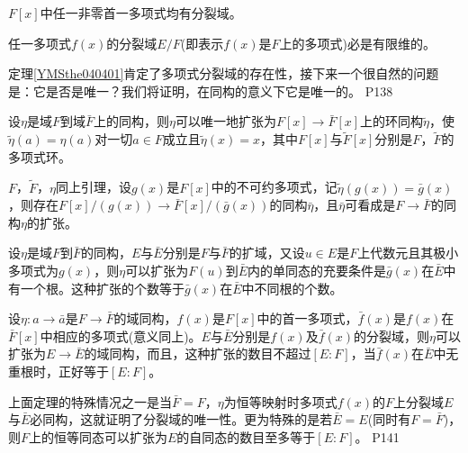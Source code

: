 \begin{theorem}\label{YMSthe040401}
	$F[x]$中任一非零首一多项式均有分裂域。
\end{theorem}

\begin{proposition}
	任一多项式$f(x)$的分裂域$E/F$(即表示$f(x)$是$F$上的多项式)必是有限维的。
\end{proposition}

\original
{
	定理\ref{YMSthe040401}肯定了多项式分裂域的存在性，接下来一个很自然的问题是：它是否是唯一？我们将证明，在同构的意义下它是唯一的。
}
{P138}

\begin{lemma}
	设$\eta$是域$F$到域$\bar{F}$上的同构，则$\eta$可以唯一地扩张为$F[x]\rightarrow \bar{F}[x]$上的环同构$\tilde{\eta}$，使$\tilde{\eta}(a)=\eta(a)$对一切$a\in F$成立且$\tilde{\eta}(x)=x$，其中$F[x]$与$\tilde{F}[x]$分别是$F$，$\tilde{F}$的多项式环。
\end{lemma}

\begin{lemma}
	$F$，$\tilde{F}$，$\eta$同上引理，设$g(x)$是$F[x]$中的不可约多项式，记$\tilde{\eta}(g(x))=\bar{g}(x)$，则存在$F[x]/(g(x))\rightarrow \bar{F}[x]/(\bar{g}(x))$的同构$\bar{\eta}$，且$\bar{\eta}$可看成是$F\rightarrow \bar{F}$的同构$\eta$的扩张。
\end{lemma}


\begin{lemma}
	设$\eta$是域$F$到$\bar{F}$的同构，$E$与$\bar{E}$分别是$F$与$\bar{F}$的扩域，又设$u\in E$是$F$上代数元且其极小多项式为$g(x)$，则$\eta$可以扩张为$F(u)$到$\bar{E}$内的单同态的充要条件是$\bar{g}(x)$在$\bar{E}$中有一个根。这种扩张的个数等于$\bar{g}(x)$在$\bar{E}$中不同根的个数。
\end{lemma}


\begin{theorem}\label{YMSthe040402}
	设$\eta :a\rightarrow \bar{a}$是$F\rightarrow\bar{F}$的域同构，$f(x)$是$F[x]$中的首一多项式，$\bar{f}(x)$是$f(x)$在$\bar{F}[x]$中相应的多项式(意义同上)。$E$与$\bar{E}$分别是$f(x)$及$\bar{f}(x)$的分裂域，则$\eta$可以扩张为$E \rightarrow\bar{E}$的域同构，而且，这种扩张的数目不超过$[E:F]$，当$\bar{f}(x)$在$\bar{E}$中无重根时，正好等于$[E:F]$。
\end{theorem}

\original
{
	上面定理的特殊情况之一是当$\bar{F}=F$，$\eta$为恒等映射时多项式$f(x)$的$F$上分裂域$E$与$\bar{E}$必同构，这就证明了分裂域的唯一性。更为特殊的是若$\bar{E}=E$(同时有$F=\bar{F}$)，则$F$上的恒等同态可以扩张为$E$的自同态的数目至多等于$[E:F]$。
}
{P141}

